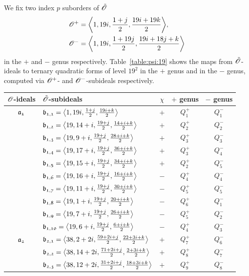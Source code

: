We fix two index $p$ suborders of ${\tilde{{\mathscr{O}}}}$
\begin{align*}
  \Ops & = \<1,19i,\frac{1+j}{2},\frac{19i+19k}{2}>, \\
  \Ons & = \<1,19i,\frac{1+19j}{2},\frac{19i+18j+k}{2}>
\end{align*}
in the $+$ and $-$ genus respectively.
Table~\ref{table:psi:19} shows the maps from ${\tilde{{\mathscr{O}}}}$-ideals
to ternary quadratic forms of level $19^2$ in the $+$ genus
and in the $-$ genus, computed via ${{\mathscr{O}}^+}$- and ${{\mathscr{O}}^-}$-subideals respectively.
\begin{table}
\begin{tabular}{|c|l|c|c|c|}
\hline
${\mathscr{O}}$-ideals & ${\tilde{{\mathscr{O}}}}$-subideals & $\chi$ & $+$ genus & $-$ genus \\
\hline\hline
${\mathfrak{a_{1}}}$ & $\id{b_{1,1}}=\<1,19i,\frac{1+j}{2},\frac{19i+k}{2}>$ & $+$ & $Q_{1}^{+}$ & $Q_{1}^{-}$\\
 & $\id{b_{1,2}}=\<19,14+i,\frac{19+j}{2},\frac{14+i+k}{2}>$ & $+$ & $Q_{2}^{+}$ & $Q_{2}^{-}$\\
 & $\id{b_{1,3}}=\<19,9+i,\frac{19+j}{2},\frac{28+i+k}{2}>$ & $+$ & $Q_{3}^{+}$ & $Q_{3}^{-}$\\
 & $\id{b_{1,4}}=\<19,17+i,\frac{19+j}{2},\frac{36+i+k}{2}>$ & $+$ & $Q_{3}^{+}$ & $Q_{4}^{-}$\\
 & $\id{b_{1,5}}=\<19,15+i,\frac{19+j}{2},\frac{34+i+k}{2}>$ & $+$ & $Q_{2}^{+}$ & $Q_{5}^{-}$\\
 & $\id{b_{1,6}}=\<19,16+i,\frac{19+j}{2},\frac{16+i+k}{2}>$ & $-$ & $Q_{4}^{+}$ & $Q_{4}^{-}$\\
 & $\id{b_{1,7}}=\<19,11+i,\frac{19+j}{2},\frac{30+i+k}{2}>$ & $-$ & $Q_{5}^{+}$ & $Q_{5}^{-}$\\
 & $\id{b_{1,8}}=\<19,1+i,\frac{19+j}{2},\frac{20+i+k}{2}>$ & $-$ & $Q_{6}^{+}$ & $Q_{1}^{-}$\\
 & $\id{b_{1,9}}=\<19,7+i,\frac{19+j}{2},\frac{26+i+k}{2}>$ & $-$ & $Q_{5}^{+}$ & $Q_{2}^{-}$\\
 & $\id{b_{1,10}}=\<19,6+i,\frac{19+j}{2},\frac{6+i+k}{2}>$ & $-$ & $Q_{4}^{+}$ & $Q_{3}^{-}$\\
\hline
${\mathfrak{a_{2}}}$ & $\id{b_{2,1}}=\<38,2+2i,\frac{59+2i+j}{2},\frac{22+3i+k}{2}>$ & $+$ & $Q_{7}^{+}$ & $Q_{6}^{-}$\\
 & $\id{b_{2,2}}=\<38,14+2i,\frac{71+2i+j}{2},\frac{2+3i+k}{2}>$ & $+$ & $Q_{8}^{+}$ & $Q_{7}^{-}$\\
 & $\id{b_{2,3}}=\<38,12+2i,\frac{31+2i+j}{2},\frac{18+3i+k}{2}>$ & $+$ & $Q_{9}^{+}$ & $Q_{8}^{-}$\\

\end{tabular}
\end{table}
